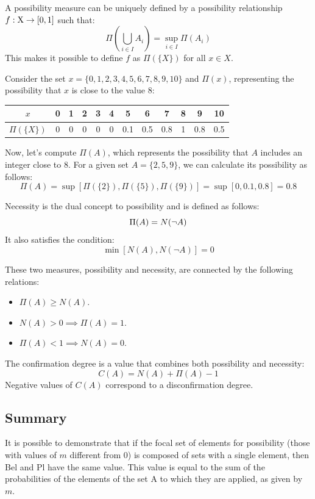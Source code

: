 A possibility measure can be uniquely defined by a possibility relationship $f:\textnormal{X} \rightarrow [0,1]$ such that:
\[\Pi\left(\bigcup_{i \in I}A_i\right)=\sup_{i \in I}\Pi\left(A_i\right)\]
This makes it possible to define $f$ as $\Pi\left(\{X\}\right)$ for all $x \in X$.
\begin{example}
    Consider the set $x=\{0,1,2,3,4,5,6,7,8,9,10\}$ and $\Pi({x})$, representing the possibility that $x$ is close to the value $8$:
    \begin{center}
        \begin{tabular}{|c|c|c|c|c|c|c|c|c|c|c|c|} 
            \hline
            $x$                         & 0 & 1 & 2 & 3 & 4 & 5     & 6     & 7     & 8 & 9     & 10    \\ \hline
            $\Pi\left(\{X\}\right) $    & 0 & 0 & 0 & 0 & 0 & 0.1   & 0.5   & 0.8   & 1 & 0.8   & 0.5   \\ \hline
        \end{tabular}
    \end{center}
    Now, let's compute $\Pi(A)$, which represents the possibility that $A$ includes an integer close to $8$. 
    For a given set $A=\{2,5,9\}$, we can calculate its possibility as follows: 
    \[\Pi(A)=\sup \left[\Pi\left(\{2\}\right), \Pi\left(\{5\}\right), \Pi\left(\{9\}\right)\right]=\sup\left[0,0.1,0.8\right]=0.8\]
\end{example}
\begin{definition}
    Necessity is the dual concept to possibility and is defined as follows:
    \[\Pi(A)=\-N(\lnot A)\]
    It also satisfies the condition:
    \[\min\left[N(A),N(\lnot A)\right]=0\]
\end{definition}
These two measures, possibility and necessity, are connected by the following relations:
\begin{itemize}
    \item $\Pi(A) \geq N(A)$.
    \item $N(A) > 0 \implies \Pi(A)=1$.
    \item $\Pi(A) < 1 \implies N(A)=0$.
\end{itemize}
\begin{definition}
    The confirmation degree is a value that combines both possibility and necessity:
    \[C(A)=N(A)+\Pi(A)-1\]
    Negative values of $C(A)$ correspond to a disconfirmation degree.
\end{definition}

\subsection{Summary}
It is possible to demonstrate that if the focal set of elements for possibility (those with values of $m$ different from $0$) is composed of sets with a single element, then Bel and Pl have the same value. 
This value is equal to the sum of the probabilities of the elements of the set A to which they are applied, as given by $m$.

